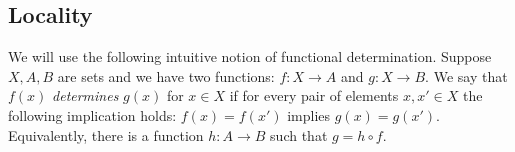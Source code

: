 %
%
%

\subsection{Locality}
We will use the following intuitive notion of functional determination.
Suppose $X,A,B$ are sets and we have two functions: $f\colon X\to A$ and $g\colon X\to B$.
We say that $f(x)$ {\em{determines}} $g(x)$ for $x\in X$ if for every pair of elements $x,x'\in X$ the following implication holds: $f(x)=f(x')$ implies $g(x)=g(x')$.
Equivalently, there is a function $h\colon A\to B$ such that $g=h\circ f$.

